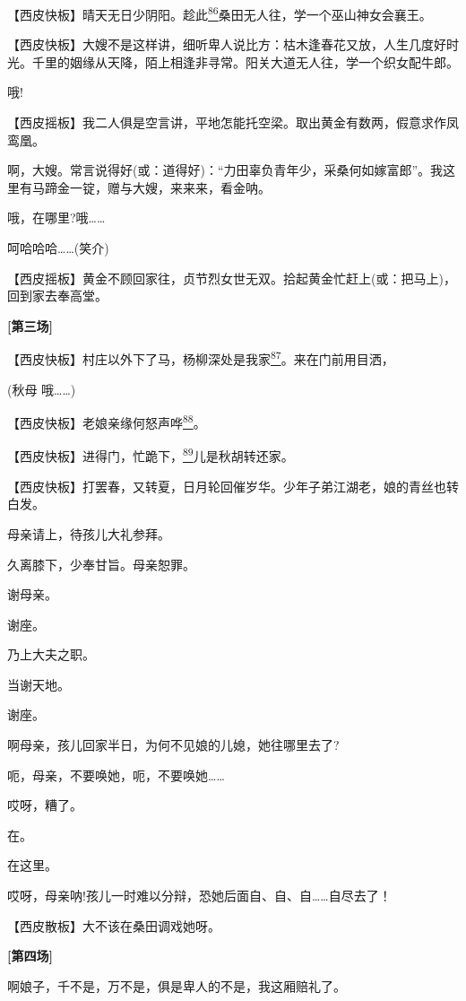 【西皮快板】晴天无日少阴阳。趁此\protect\hyperlink{fn86}{\textsuperscript{86}}桑田无人往，学一个巫山神女会襄王。

【西皮快板】大嫂不是这样讲，细听卑人说比方：枯木逢春花又放，人生几度好时光。千里的姻缘从天降，陌上相逢非寻常。阳关大道无人往，学一个织女配牛郎。

哦!

【西皮摇板】我二人俱是空言讲，平地怎能托空梁。取出黄金有数两，假意求作凤鸾凰。

啊，大嫂。常言说得好(或：道得好)：``力田辜负青年少，采桑何如嫁富郎''。我这里有马蹄金一锭，赠与大嫂，来来来，看金呐。

哦，在哪里?哦\ldots{}\ldots{}

呵哈哈哈\ldots{}\ldots{}(笑介)

【西皮摇板】黄金不顾回家往，贞节烈女世无双。拾起黄金忙赶上(或：把马上)，回到家去奉高堂。

\textbf{{[}第三场{]}}

【西皮快板】村庄以外下了马，杨柳深处是我家\protect\hyperlink{fn87}{\textsuperscript{87}}。来在门前用目洒，

(秋母 哦\ldots{}\ldots{})

【西皮快板】老娘亲缘何怒声哗\protect\hyperlink{fn88}{\textsuperscript{88}}。

【西皮快板】进得门，忙跪下，\protect\hyperlink{fn89}{\textsuperscript{89}}儿是秋胡转还家。

【西皮快板】打罢春，又转夏，日月轮回催岁华。少年子弟江湖老，娘的青丝也转白发。

母亲请上，待孩儿大礼参拜。

久离膝下，少奉甘旨。母亲恕罪。

谢母亲。

谢座。

乃上大夫之职。

当谢天地。

谢座。

啊母亲，孩儿回家半日，为何不见娘的儿媳，她往哪里去了?

呃，母亲，不要唤她，呃，不要唤她\ldots{}\ldots{}

哎呀，糟了。

在。

在这里。

哎呀，母亲呐!孩儿一时难以分辩，恐她后面自、自、自\ldots{}\ldots{}自尽去了！

【西皮散板】大不该在桑田调戏她呀。

\textbf{{[}第四场{]}}

啊娘子，千不是，万不是，俱是卑人的不是，我这厢赔礼了。

